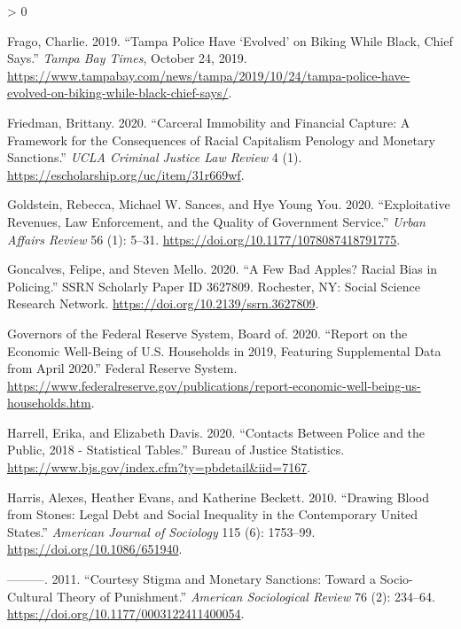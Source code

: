 \documentclass[
  12pt,
]{article}
\newlength{\cslhangindent}
\newenvironment{CSLReferences}[2] %
 {%
  \setlength{\parindent}{0pt}
  \ifodd #1 \everypar{\setlength{\hangindent}{\cslhangindent}}\ignorespaces\fi
  \ifnum #2 > 0
  \setlength{\parskip}{#2\baselineskip}
  \fi
 }%
 {}
\begin{document}
\begin{CSLReferences}{1}{0}
\leavevmode\hypertarget{ref-Frago2019}{}%
Frago, Charlie. 2019. {``Tampa Police Have {`Evolved'} on Biking While Black, Chief Says.''} \emph{Tampa Bay Times}, October 24, 2019. \url{https://www.tampabay.com/news/tampa/2019/10/24/tampa-police-have-evolved-on-biking-while-black-chief-says/}.

\leavevmode\hypertarget{ref-Friedman2020}{}%
Friedman, Brittany. 2020. {``Carceral {Immobility} and {Financial Capture}: {A Framework} for the {Consequences} of {Racial Capitalism Penology} and {Monetary Sanctions}.''} \emph{UCLA Criminal Justice Law Review} 4 (1). \url{https://escholarship.org/uc/item/31r669wf}.

\leavevmode\hypertarget{ref-Goldstein2020}{}%
Goldstein, Rebecca, Michael W. Sances, and Hye Young You. 2020. {``Exploitative {Revenues}, {Law Enforcement}, and the {Quality} of {Government Service}.''} \emph{Urban Affairs Review} 56 (1): 5--31. \url{https://doi.org/10.1177/1078087418791775}.

\leavevmode\hypertarget{ref-Goncalves2020}{}%
Goncalves, Felipe, and Steven Mello. 2020. {``A {Few Bad Apples}? {Racial Bias} in {Policing}.''} SSRN Scholarly Paper ID 3627809. {Rochester, NY}: {Social Science Research Network}. \url{https://doi.org/10.2139/ssrn.3627809}.

\leavevmode\hypertarget{ref-BoardofGovernorsoftheFederalReserveSystem2020}{}%
Governors of the Federal Reserve System, Board of. 2020. {``Report on the {Economic Well}-{Being} of {U}.{S}. {Households} in 2019, {Featuring Supplemental Data} from {April} 2020.''} {Federal Reserve System}. \url{https://www.federalreserve.gov/publications/report-economic-well-being-us-households.htm}.

\leavevmode\hypertarget{ref-Harrell2020}{}%
Harrell, Erika, and Elizabeth Davis. 2020. {``Contacts {Between Police} and the {Public}, 2018 - {Statistical Tables}.''} {Bureau of Justice Statistics}. \url{https://www.bjs.gov/index.cfm?ty=pbdetail\&iid=7167}.

\leavevmode\hypertarget{ref-Harris2010}{}%
Harris, Alexes, Heather Evans, and Katherine Beckett. 2010. {``Drawing {Blood} from {Stones}: {Legal Debt} and {Social Inequality} in the {Contemporary United States}.''} \emph{American Journal of Sociology} 115 (6): 1753--99. \url{https://doi.org/10.1086/651940}.

\leavevmode\hypertarget{ref-Harris2011}{}%
---------. 2011. {``Courtesy {Stigma} and {Monetary Sanctions}: {Toward} a {Socio}-{Cultural Theory} of {Punishment}.''} \emph{American Sociological Review} 76 (2): 234--64. \url{https://doi.org/10.1177/0003122411400054}.


\end{CSLReferences}
\end{document}
